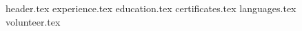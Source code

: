 \documentclass[a4paper,12pt]{article}
\begin{document}

{header.tex}
{experience.tex}
{education.tex}
{certificates.tex}
{languages.tex}
{volunteer.tex}
\end{document}
